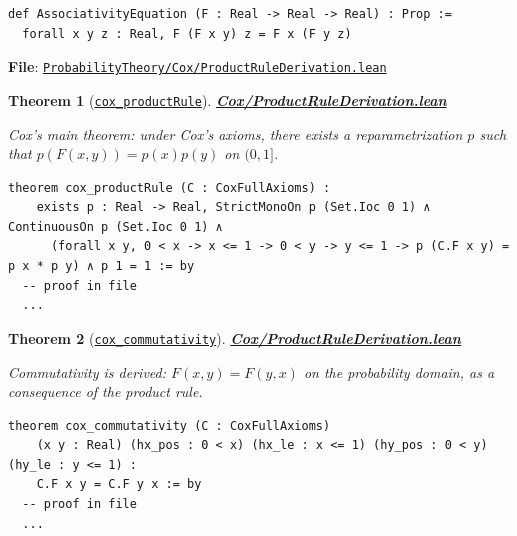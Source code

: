 \documentclass[11pt]{article}
\newtheorem{theorem}{Theorem}[section]
\theoremstyle{definition}
\theoremstyle{remark}
\begin{document}
\begin{lstlisting}[caption={Associativity functional equation}]
def AssociativityEquation (F : Real -> Real -> Real) : Prop :=
  forall x y z : Real, F (F x y) z = F x (F y z)
\end{lstlisting}

\textbf{File}: \href{https://github.com/zariuq/ks-foundations-of-inference/blob/main/ProbabilityTheory/Cox/ProductRuleDerivation.lean}{\texttt{ProbabilityTheory/Cox/ProductRuleDerivation.lean}}

\begin{theorem}[\href{https://github.com/zariuq/ks-foundations-of-inference/blob/main/ProbabilityTheory/Cox/ProductRuleDerivation.lean}{\texttt{cox\_productRule}}]
\textbf{\href{https://github.com/zariuq/ks-foundations-of-inference/blob/main/ProbabilityTheory/Cox/ProductRuleDerivation.lean}{Cox/ProductRuleDerivation.lean}}

Cox's main theorem: under Cox's axioms, there exists a reparametrization $p$ such that
$p(F(x,y)) = p(x)p(y)$ on $(0,1]$.
\end{theorem}

\begin{lstlisting}[caption={Cox product rule theorem (reparametrized)}]
theorem cox_productRule (C : CoxFullAxioms) :
    exists p : Real -> Real, StrictMonoOn p (Set.Ioc 0 1) ∧ ContinuousOn p (Set.Ioc 0 1) ∧
      (forall x y, 0 < x -> x <= 1 -> 0 < y -> y <= 1 -> p (C.F x y) = p x * p y) ∧ p 1 = 1 := by
  -- proof in file
  ...
\end{lstlisting}

\begin{theorem}[\href{https://github.com/zariuq/ks-foundations-of-inference/blob/main/ProbabilityTheory/Cox/ProductRuleDerivation.lean}{\texttt{cox\_commutativity}}]
\textbf{\href{https://github.com/zariuq/ks-foundations-of-inference/blob/main/ProbabilityTheory/Cox/ProductRuleDerivation.lean}{Cox/ProductRuleDerivation.lean}}

Commutativity is derived: $F(x,y)=F(y,x)$ on the probability domain, as a consequence of the product rule.
\end{theorem}

\begin{lstlisting}[caption={Cox commutativity derived from multiplicative representation}]
theorem cox_commutativity (C : CoxFullAxioms)
    (x y : Real) (hx_pos : 0 < x) (hx_le : x <= 1) (hy_pos : 0 < y) (hy_le : y <= 1) :
    C.F x y = C.F y x := by
  -- proof in file
  ...
\end{lstlisting}
\end{document}
